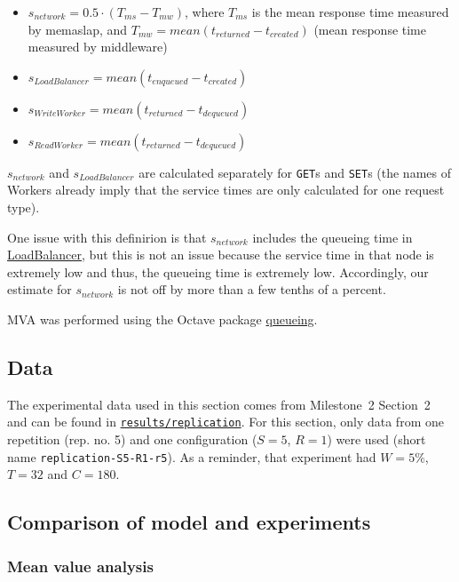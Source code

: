 \documentclass[11pt]{article}
\newcommand{\get}[0]{\texttt{GET}}
\newcommand{\set}[0]{\texttt{SET}}
\newcommand{\linkmain}[1]{\href{https://gitlab.inf.ethz.ch/pungast/asl-fall16-project/blob/master/src/main/java/asl/#1.java}{#1}}
\begin{document}
\begin{itemize}
	\item $s_{network} = 0.5 \cdot (T_{ms} - T_{mw})$, where $T_{ms}$ is the mean response time measured by memaslap, and $T_{mw} = mean(t_{returned}-t_{created})$ (mean response time measured by middleware)
	\item $s_{LoadBalancer} = mean(t_{enqueued}-t_{created})$
	\item $s_{WriteWorker} = mean(t_{returned}-t_{dequeued})$
	\item $s_{ReadWorker} = mean(t_{returned}-t_{dequeued})$
\end{itemize}

$s_{network}$ and $s_{LoadBalancer}$ are calculated separately for \get{}s and \set{}s (the names of Workers already imply that the service times are only calculated for one request type).

One issue with this definirion is that $s_{network}$ includes the queueing time in \linkmain{LoadBalancer}, but this is not an issue because the service time in that node is extremely low and thus, the queueing time is extremely low. Accordingly, our estimate for $s_{network}$ is not off by more than a few tenths of a percent.

MVA was performed using the Octave package \href{http://www.moreno.marzolla.name/software/queueing/queueing.html}{queueing}.


\subsection{Data}
\label{sec:part3:data}
The experimental data used in this section comes from Milestone~2 Section~2 and can be found in \texttt{\href{https://gitlab.inf.ethz.ch/pungast/asl-fall16-project/tree/master/results/replication}{results/replication}}. For this section, only data from one repetition (rep. no. 5) and one configuration ($S=5$, $R=1$) were used (short name \texttt{replication-S5-R1-r5}). As a reminder, that experiment had $W=5\%$, $T=32$ and $C=180$.

\subsection{Comparison of model and experiments}



\subsubsection{Mean value analysis}
\end{document}
